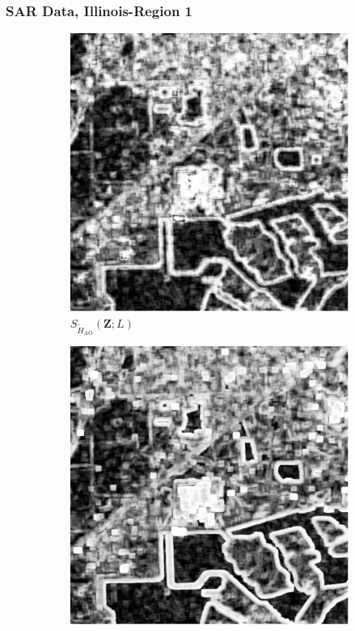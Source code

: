 \documentclass[aspectratio=1610,10pt]{beamer}
\begin{document}
\begin{frame} \frametitle{\large{SAR Data, Illinois-Region 1 }}\vspace{-0.1cm}
\begin{figure}[H]
  \centering
  \begin{subfigure}[b]{0.3\textwidth}
    \centering
    \includegraphics[width=\textwidth]{../../Figures/PNG/Entropy_lake_512_36L_AO_100b}
    \caption{$S_{\widetilde{H}_{\text{AO}}}(\bm{Z}; L)$}
    \label{fig:test_lake-1}
  \end{subfigure}
  \hfill
  \begin{subfigure}[b]{0.3\textwidth}
    \centering
    \includegraphics[width=\textwidth]{../../Figures/PNG/cv_lake_512}

\end{subfigure}
\end{figure}
\end{frame}
\end{document}

